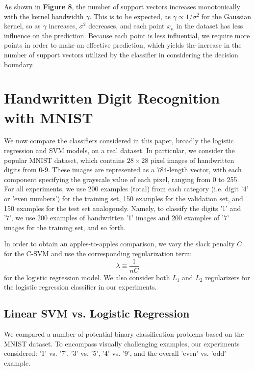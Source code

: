 \documentclass[10pt,psamsfonts]{amsart}
\theoremstyle{definition}
\theoremstyle{remark}
\numberwithin{equation}{section}
\begin{document}
As shown in {\bf Figure 8}, the number of support vectors increases monotonically with the kernel bandwidth $\gamma$. This is to be expected, as $\gamma \propto 1/\sigma^2$ for the Gaussian kernel, so as $\gamma$ increases, $\sigma^2$ decreases, and each point $x_n$ in the dataset has less influence on the prediction. Because each point is less influential, we require more points in order to make an effective prediction, which yields the increase in the number of support vectors utilized by the classifier in considering the decision boundary.\\

\section{Handwritten Digit Recognition with MNIST}

We now compare the classifiers considered in this paper, broadly the logistic regression and SVM models, on a real dataset. In particular, we consider the popular MNIST dataset, which contains $28\times 28$ pixel images of handwritten digits from 0-9. These images are represented as a 784-length vector, with each component specifying the grayscale value of each pixel, ranging from 0 to 255. For all experiments, we use 200 examples (total) from each category (i.e. digit '4' or 'even numbers') for the training set, 150 examples for the validation set, and 150 examples for the test set analogously. Namely, to classify the digits '1' and '7', we use 200 examples of handwritten '1' images and 200 examples of '7' images for the training set, and so forth.

In order to obtain an apples-to-apples comparison, we vary the slack penalty $C$ for the C-SVM and use the corresponding regularization term:
$$\lambda \equiv \frac{1}{nC}$$
for the logistic regression model. We also consider both $L_1$ and $L_2$ regularizers for the logistic regression classifier in our experiments.

\subsection{Linear SVM vs. Logistic Regression} We compared a number of potential binary classification problems based on the MNIST dataset. To encompass visually challenging examples, our experiments considered: '1' vs. '7', '3' vs. '5', '4' vs. '9', and the overall 'even' vs. 'odd' example.
\end{document}

